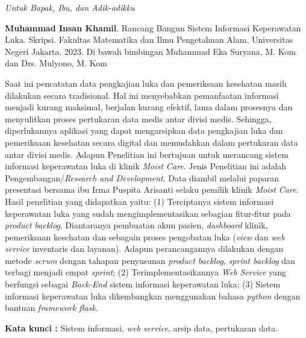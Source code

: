 \documentclass{jtetiskripsi}
\begin{document}
\cover
%
\newpage
{}



\acknowledgment
\begin{flushright}
	\emph{Untuk Bapak, Ibu, dan Adik-adikku}
\end{flushright}

\begin{abstractind}
	\textbf{Muhammad Insan Khamil}. Rancang Bangun Sistem Informasi Keperawatan Luka. Skripsi. Fakultas Matematika dan Ilmu Pengetahuan Alam, Universitas Negeri Jakarta. 2023. Di bawah bimbingan Muhammad Eka Suryana, M. Kom dan Drs. Mulyono, M. Kom
	\vskip1cm
	
	Saat ini pencatatan data pengkajian luka dan pemeriksaan kesehatan masih dilakukan secara tradisional. Hal ini menyebabkan pemanfaatan informasi menjadi kurang maksimal, berjalan kurang efektif, lama dalam prosesnya dan menyulitkan proses pertukaran data medis antar divisi medis. Sehingga, diperlukannya aplikasi yang dapat mengarsipkan data pengkajian luka dan pemeriksaan kesehatan secara digital dan memudahkan dalam pertukaran data antar divisi medis. Adapun Penelitian ini bertujuan untuk merancang sistem informasi keperawatan luka di klinik \emph{Moist Care}. Jenis Penelitian ini adalah Pengembangan/\emph{Research and Development}. Data diambil melalui paparan presentasi bersama ibu Irma Puspita Arisanti selaku pemilik klinik \emph{Moist Care}. Hasil penelitian yang didapatkan yaitu: (1) Terciptanya sistem informasi keperawatan luka yang sudah mengimplementasikan sebagian fitur-fitur pada \emph{product backlog}. Diantaranya pembuatan akun pasien, \emph{dashboard} klinik, pemeriksaan kesehatan dan sebagain proses pengobatan luka (\emph{view} dan \emph{web service} inventaris dan layanan). Adapun perancangannya dilakukan dengan metode \emph{scrum} dengan tahapan penyusunan \emph{product backlog}, \emph{sprint backlog} dan terbagi menjadi empat \emph{sprint}; (2) Terimplementasikannya \emph{Web Service} yang berfungsi sebagai \emph{Back-End} sistem informasi keperawatan luka; (3) Sistem informasi keperawatan luka dikembangkan menggunakan bahasa \emph{python} dengan bantuan \emph{framework flask}. 
	
	\bigskip
	\noindent
	\textbf{Kata kunci :} Sistem informasi, \emph{web service}, arsip data, pertukaran data.
\end{abstractind}
\end{document}
